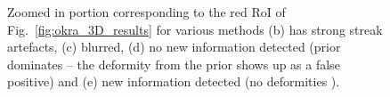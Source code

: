 \documentclass[journal]{IEEEtran}
\begin{document}
\begin{figure}[!h]
\centering
{}\hfill
{}\hfill
{}\hfill
{}\hfill
{}
\caption{Zoomed in portion corresponding to the red RoI of Fig.~\ref{fig:okra_3D_results} for various methods (b) has strong streak artefacts, (c) blurred, (d) no new  information detected (prior dominates -- the deformity from the prior
  shows up as a false positive) and (e) new information detected (no deformities
 ).}
\label{fig:okra_zoomed_3D_results}
\end{figure}
\end{document}
